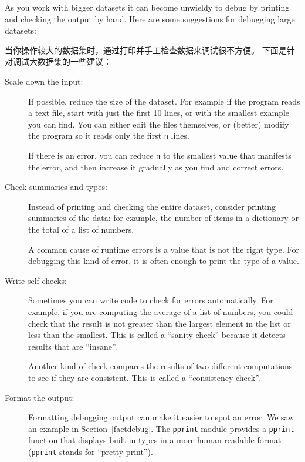 As you work with bigger datasets it can become unwieldy to
debug by printing and checking the output by hand.  Here are some
suggestions for debugging large datasets:

当你操作较大的数据集时，通过打印并手工检查数据来调试很不方便。
下面是针对调试大数据集的一些建议：

\begin{description}

\item[Scale down the input:] If possible, reduce the size of the
dataset.  For example if the program reads a text file, start with
just the first 10 lines, or with the smallest example you can find.
You can either edit the files themselves, or (better) modify the
program so it reads only the first {\tt n} lines.

If there is an error, you can reduce {\tt n} to the smallest
value that manifests the error, and then increase it gradually
as you find and correct errors.

\item[Check summaries and types:] Instead of printing and checking the
entire dataset, consider printing summaries of the data: for example,
the number of items in a dictionary or the total of a list of numbers.

A common cause of runtime errors is a value that is not the right
type.  For debugging this kind of error, it is often enough to print
the type of a value.

\item[Write self-checks:]  Sometimes you can write code to check
for errors automatically.  For example, if you are computing the
average of a list of numbers, you could check that the result is
not greater than the largest element in the list or less than
the smallest.  This is called a ``sanity check'' because it detects
results that are ``insane''.

  

Another kind of check compares the results of two different
computations to see if they are consistent.  This is called a
``consistency check''.

\item[Format the output:] Formatting debugging output
can make it easier to spot an error.  We saw an example in
Section~\ref{factdebug}.  The {\tt pprint} module provides
a {\tt pprint} function that displays built-in types in
a more human-readable format ({\tt pprint} stands for
``pretty print'').

  

\end{description}

